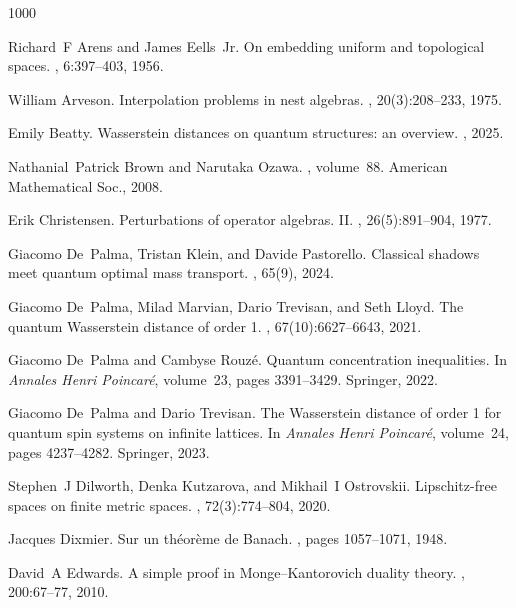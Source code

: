 \documentclass{amsart}[14pt]
\theoremstyle{definition}
\theoremstyle{remark}
\newcommand{\<}{\langle}
\renewcommand{\>}{\rangle}
\numberwithin{equation}{section}
\begin{document}
{%

\begin{thebibliography}{1000}

Richard~F Arens and James Eells~Jr.
\newblock On embedding uniform and topological spaces.
, 6:397--403, 1956.

William Arveson.
\newblock Interpolation problems in nest algebras.
, 20(3):208--233, 1975.

Emily Beatty.
\newblock Wasserstein distances on quantum structures: an overview.
, 2025.

Nathanial~Patrick Brown and Narutaka Ozawa.
, volume~88.
\newblock American Mathematical Soc., 2008.

Erik Christensen.
\newblock Perturbations of operator algebras. {II}.
, 26(5):891--904, 1977.

Giacomo De~Palma, Tristan Klein, and Davide Pastorello.
\newblock Classical shadows meet quantum optimal mass transport.
, 65(9), 2024.

Giacomo De~Palma, Milad Marvian, Dario Trevisan, and Seth Lloyd.
\newblock The quantum Wasserstein distance of order 1.
, 67(10):6627--6643,
  2021.

Giacomo De~Palma and Cambyse Rouz{\'e}.
\newblock Quantum concentration inequalities.
\newblock In {\em Annales Henri Poincar{\'e}}, volume~23, pages 3391--3429.
  Springer, 2022.

Giacomo De~Palma and Dario Trevisan.
\newblock The Wasserstein distance of order 1 for quantum spin systems on
  infinite lattices.
\newblock In {\em Annales Henri Poincar{\'e}}, volume~24, pages 4237--4282.
  Springer, 2023.

Stephen~J Dilworth, Denka Kutzarova, and Mikhail~I Ostrovskii.
\newblock Lipschitz-free spaces on finite metric spaces.
, 72(3):774--804, 2020.

Jacques Dixmier.
\newblock Sur un th{\'e}or{\`e}me de Banach.
, pages 1057--1071, 1948.

David~A Edwards.
\newblock A simple proof in Monge--Kantorovich duality theory.
, 200:67--77, 2010.


\end{thebibliography}}
\end{document}
